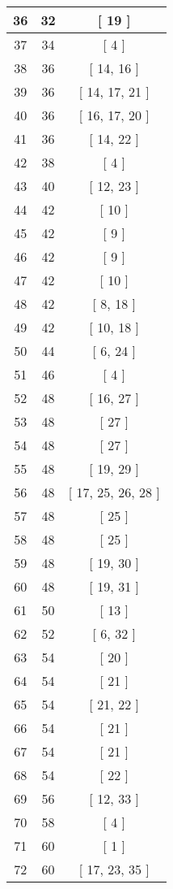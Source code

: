 \begin{center}
\begin{longtable}[H]{|| c c c ||}
\hline
36 & 32 & [ 19 ] \\ 
\hline
37 & 34 & [ 4 ] \\ 
\hline
38 & 36 & [ 14, 16 ] \\ 
\hline
39 & 36 & [ 14, 17, 21 ] \\ 
\hline
40 & 36 & [ 16, 17, 20 ] \\ 
\hline
41 & 36 & [ 14, 22 ] \\ 
\hline
42 & 38 & [ 4 ] \\ 
\hline
43 & 40 & [ 12, 23 ] \\ 
\hline
44 & 42 & [ 10 ] \\ 
\hline
45 & 42 & [ 9 ] \\ 
\hline
46 & 42 & [ 9 ] \\ 
\hline
47 & 42 & [ 10 ] \\ 
\hline
48 & 42 & [ 8, 18 ] \\ 
\hline
49 & 42 & [ 10, 18 ] \\ 
\hline
50 & 44 & [ 6, 24 ] \\ 
\hline
51 & 46 & [ 4 ] \\ 
\hline
52 & 48 & [ 16, 27 ] \\ 
\hline
53 & 48 & [ 27 ] \\ 
\hline
54 & 48 & [ 27 ] \\ 
\hline
55 & 48 & [ 19, 29 ] \\ 
\hline
56 & 48 & [ 17, 25, 26, 28 ] \\ 
\hline
57 & 48 & [ 25 ] \\ 
\hline
58 & 48 & [ 25 ] \\ 
\hline
59 & 48 & [ 19, 30 ] \\ 
\hline
60 & 48 & [ 19, 31 ] \\ 
\hline
61 & 50 & [ 13 ] \\ 
\hline
62 & 52 & [ 6, 32 ] \\ 
\hline
63 & 54 & [ 20 ] \\ 
\hline
64 & 54 & [ 21 ] \\ 
\hline
65 & 54 & [ 21, 22 ] \\ 
\hline
66 & 54 & [ 21 ] \\ 
\hline
67 & 54 & [ 21 ] \\ 
\hline
68 & 54 & [ 22 ] \\ 
\hline
69 & 56 & [ 12, 33 ] \\ 
\hline
70 & 58 & [ 4 ] \\ 
\hline
71 & 60 & [ 1 ] \\ 
\hline
72 & 60 & [ 17, 23, 35 ] \\ 
\hline

\end{longtable}
\end{center}
